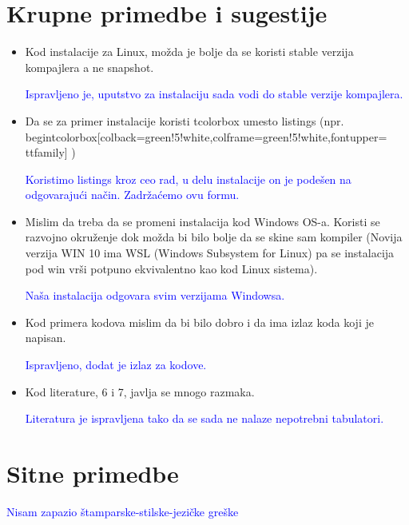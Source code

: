 \documentclass[a4paper]{report}
\newcommand{\odgovor}[1]{\textcolor{blue}{#1}}
\begin{document}
\section{Krupne primedbe i sugestije}
\begin{itemize}
    \item Kod instalacije za Linux, možda je bolje da se koristi stable verzija kompajlera a ne snapshot.
    
    \odgovor{Ispravljeno je, uputstvo za instalaciju sada vodi do stable verzije kompajlera.}
    
	\item Da se za primer instalacije koristi tcolorbox umesto listings (npr. \\begin{tcolorbox}[colback=green!5!white,colframe=green!5!white,fontupper=\\ttfamily] )
	
    \odgovor{Koristimo listings kroz ceo rad, u delu instalacije on je podešen na odgovarajući način. Zadržaćemo ovu formu. }
    
	\item Mislim da treba da se promeni instalacija kod Windows OS-a. Koristi se razvojno okruženje dok možda bi bilo bolje da se skine sam kompiler (Novija verzija WIN 10 ima WSL (Windows Subsystem for Linux) pa se 
	instalacija pod win vrši potpuno ekvivalentno kao kod Linux sistema).
	
	\odgovor{Naša instalacija odgovara svim verzijama Windowsa.}

	\item Kod primera kodova mislim da bi bilo dobro i da ima izlaz koda koji je napisan.
	
	\odgovor{Ispravljeno, dodat je izlaz za kodove.}

	\item Kod literature, 6 i 7, javlja se mnogo razmaka.
	
	\odgovor{Literatura je ispravljena tako da se sada ne nalaze nepotrebni tabulatori.}
	
\end{itemize}

\section{Sitne primedbe}
\odgovor{Nisam zapazio štamparske-stilske-jezičke greške}
\end{document}

